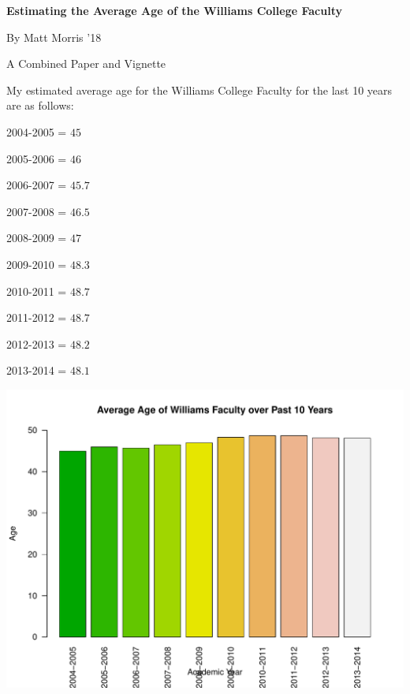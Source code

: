 \documentclass[12pt,a4paper]{article}\usepackage[]{graphicx}\usepackage[]{color}
\makeatletter
\def\maxwidth{ %
  \ifdim\Gin@nat@width>\linewidth
    \linewidth
  \else
    \Gin@nat@width
  \fi
}
\newenvironment{knitrout}{}{} %
\theoremstyle{definition}
\makeatother
\begin{document}
\thispagestyle{empty}
\centerline{\bf{Estimating the Average Age of the Williams College Faculty}}
\bigskip
\centerline{By Matt Morris '18}
\bigskip
\centerline{A Combined Paper and Vignette}

















\bigskip
My estimated average age for the Williams College Faculty for the last 10 years are as follows:

\begin{center}

2004-2005 = \(45\)

2005-2006 = \(46\)

2006-2007 = \(45.7\)

2007-2008 = \(46.5\)

2008-2009 = \(47\)

2009-2010 = \(48.3\)

2010-2011 = \(48.7\)

2011-2012 = \(48.7\)

2012-2013 = \(48.2\)

2013-2014 = \(48.1\)

\end{center}


\begin{knitrout}
\color{fgcolor}
\includegraphics[width=\maxwidth]{figure/unnamed-chunk-5-1} 

\end{knitrout}
\end{document}
